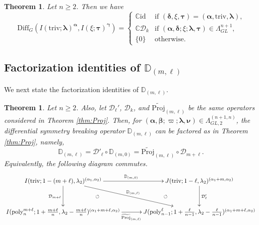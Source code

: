 \documentclass[reqno,11pt]{amsart}
\newtheorem{thm}[equation]{Theorem}
\theoremstyle{remark}
\theoremstyle{definition}
\numberwithin{equation}{section}
\newcommand{\ga}{\alpha}
\newcommand{\gL}{\Lambda}
\newcommand{\C}{\mathbb{C}}
\newcommand{\Cal}{\mathcal}
\newcommand{\poly}{\mathrm{poly}}
\newcommand{\Diff}{\mathrm{Diff}}
\newcommand{\triv}{\mathrm{triv}}
\newcommand{\id}{\mathrm{id}}
\newcommand{\balpha}{\bm{\alpha}}
\newcommand{\bbeta}{\bm{\beta}}
\newcommand{\bgamma}{\bm{\gamma}}
\newcommand{\blambda}{\bm{\lambda}}
\newcommand{\bnu}{\bm{\nu}}
\newcommand{\btau}{\bm{\tau}}
\newcommand{\wProj}{\widetilde{\mathrm{Proj}}}
\newcommand{\D}{\Cal{D}}
\newcommand{\bD}{\mathbb{D}}
\begin{document}
\begin{thm}%
\label{thm:GL-IDO}
Let $n\geq 2$.
Then we have
\begin{equation*}
\Diff_{G}(I(\triv; \blambda)^{\balpha}, I(\xi; \btau)^{\bgamma})
=
\begin{cases}
\C\id & \text{if $(\bm{\delta}, \xi, \bm{\tau}) = (\balpha, \triv, \blambda)$,}\\
\C \D_k & \text{if $(\bm{\alpha}, \bm{\delta};\xi; \bm{\lambda}, \bm{\tau})\in \Lambda^{n+1}_{GL}$,}\\
\{0\} & \text{otherwise.}
\end{cases}
\end{equation*}

\end{thm}

\subsection{
Factorization identities of $\bD_{(m,\ell)}$
}
\label{sec:GL-factor}

We next state the factorization identities of $\bD_{(m,\ell)}$.

\begin{thm}\label{thm:GL-factor}
Let $n\geq 2$.
Also,
let $\D_\ell'$, $\D_k$, and $\wProj_{(m,\ell)}$ be the same operators
considered in Theorem \ref{thm:Proj}.
Then, for
$(\balpha,\bbeta;\varpi;\blambda ,\bnu) \in 
\gL^{(n+1,n)}_{GL,2}$,
the differential symmetry breaking operator
$\bD_{(m,\ell)}$ can be factored as in Theorem \ref{thm:Proj}, namely,
\begin{equation*}
\bD_{(m,\ell)} 
= \D'_\ell \circ \bD_{(m,0)}
=  \wProj_{(m,\ell)}\circ \D_{m+\ell}.
\end{equation*}
Equivalently, the following diagram commutes.
\begin{equation}\label{eqn:factor0826a}
\xymatrix@=13pt{
I(\triv; 1-(m+\ell),\lambda_2)^{(\ga_1,\ga_2)}
 \ar[dd]_{\D_{m+\ell}}
  \ar[rrdd]^{\bD_{(m,\ell)}}
  \ar[rr]^{\bD_{(m,0)}}
 && J(\triv; 1-\ell,\lambda_2)^{(\ga_1+m,\ga_2)}
  \ar[dd]^{\D'_\ell}
  \ar@{}[ldd]|{\circlearrowleft}
 \\
&&\\
I(\poly^{m+\ell}_n; 1+\tfrac{m+\ell}{n},\lambda_2-\frac{m+\ell}{n})^{(\ga_1+m+\ell,\ga_2)}
\ar[rr]_{\wProj_{(m,\ell)}}   \ar@{}[ruu]|{\circlearrowleft}
&&
J(\poly^\ell_{n-1}; 1+\tfrac{\ell}{n-1},\lambda_2-\tfrac{\ell}{n-1})^{(\ga_1+m+\ell,\ga_2)}
}
\end{equation}
\end{thm}
\end{document}
